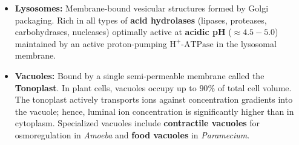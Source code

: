 \documentclass[10pt,twoside,openright]{book}
\begin{document}
\begin{conceptbox}
\begin{itemize}[leftmargin=*]
  \item \textbf{Lysosomes:}
  Membrane-bound vesicular structures formed by Golgi packaging. Rich in all types of \textbf{acid hydrolases} (lipases, proteases, carbohydrases, nucleases) optimally active at \textbf{acidic pH} ($\approx 4.5-5.0$) maintained by an active proton-pumping $\mathrm{H}^+\text{-ATPase}$ in the lysosomal membrane.

  \item \textbf{Vacuoles:}
  Bound by a single semi-permeable membrane called the \textbf{Tonoplast}. In plant cells, vacuoles occupy up to $90\%$ of total cell volume. The tonoplast actively transports ions against concentration gradients into the vacuole; hence, luminal ion concentration is significantly higher than in cytoplasm. Specialized vacuoles include \textbf{contractile vacuoles} for osmoregulation in \textit{Amoeba} and \textbf{food vacuoles} in \textit{Paramecium}.
\end{itemize}
\end{conceptbox}
\end{document}
